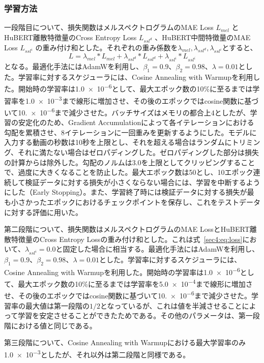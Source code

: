 \documentclass[12pt]{jarticle}
\numberwithin{equation}{section}    %
\numberwithin{figure}{section}      %
\numberwithin{table}{section}      %
\begin{document}
\subsubsection{学習方法}
一段階目について、損失関数はメルスペクトログラムのMAE Loss $L_{mel}$ とHuBERT離散特徴量のCross Entropy Loss $L_{ssl^{d}}$ 、HuBERT中間特徴量のMAE Loss $L_{ssl^{i}}$ の重み付け和とした。それぞれの重み係数を$\lambda_{mel}, \lambda_{ssl^{d}}, \lambda_{ssl^{i}}$とすると、
\begin{equation}
    \label{sec4:eq:loss}
    L = \lambda_{mel} * L_{mel} + \lambda_{ssl^{d}} * L_{ssl^{d}} + \lambda_{ssl^{i}} * L_{ssl^{i}}
\end{equation}
となる。最適化手法にはAdamW\cite{loshchilov2017decoupled}を利用し、$\beta_{1} = 0.9$、$\beta_{2} = 0.98$、$\lambda = 0.01$とした。学習率に対するスケジューラには、Cosine Annealing with Warmupを利用した。開始時の学習率は\num{1.0e-6}として、最大エポック数の10\%に至るまでは学習率を\num{1.0e-3}まで線形に増加させ、その後のエポックではcosine関数に基づいて\num{10.e-6}まで減少させた。バッチサイズはメモリの都合上4としたが、学習の安定化のため、Gradient Accumulationによって各イテレーションにおける勾配を累積させ、8イテレーションに一回重みを更新するようにした。モデルに入力する動画の秒数は10秒を上限とし、それを超える場合はランダムにトリミング、それに満たない場合はゼロパディングした。ゼロパディングした部分は損失の計算からは除外した。勾配のノルムは3.0を上限としてクリッピングすることで、過度に大きくなることを防止した。最大エポック数は50とし、10エポック連続して検証データに対する損失が小さくならない場合には、学習を中断するようにした（Early Stopping）。また、学習終了時には検証データに対する損失が最も小さかったエポックにおけるチェックポイントを保存し、これをテストデータに対する評価に用いた。

第二段階について、損失関数はメルスペクトログラムのMAE LossとHuBERT離散特徴量のCross Entropy Lossの重み付け和とした。これは式~\eqref{sec4:eq:loss}において、$\lambda_{ssl^{i}} = 0.0$と固定した場合に相当する。最適化手法にはAdamWを利用し、$\beta_{1} = 0.9$、$\beta_{2} = 0.98$、$\lambda = 0.01$とした。学習率に対するスケジューラには、Cosine Annealing with Warmupを利用した。開始時の学習率は\num{1.0e-6}として、最大エポック数の10\%に至るまでは学習率を\num{5.0e-4}まで線形に増加させ、その後のエポックではcosine関数に基づいて\num{10.e-6}まで減少させた。学習率の最大値は第一段階の$1/2$となっているが、これは値を半減させることによって学習を安定させることができたためである。その他のパラメータは、第一段階における値と同じである。

第三段階について、Cosine Annealing with Warmupにおける最大学習率のみ\num{1.0e-3}としたが、それ以外は第二段階と同様である。
\end{document}
